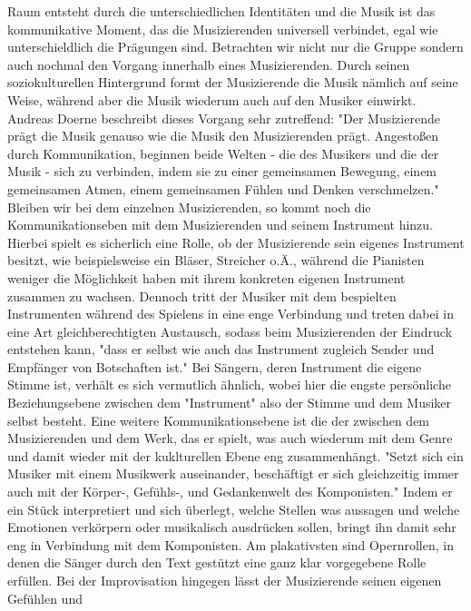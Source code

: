 Raum entsteht durch die unterschiedlichen Identitäten und die Musik ist das
kommunikative Moment, das die Musizierenden universell verbindet, egal wie
unterschieldlich die Prägungen sind. Betrachten wir nicht nur die Gruppe sondern
auch nochmal den Vorgang innerhalb eines Musizierenden. Durch seinen soziokulturellen Hintergrund
formt der Musizierende die Musik nämlich auf seine Weise, während aber die Musik
wiederum auch auf den Musiker einwirkt. Andreas Doerne beschreibt dieses Vorgang sehr
zutreffend:
"Der Musizierende prägt die Musik genauso wie die Musik den Musizierenden prägt.
Angestoßen durch Kommunikation, beginnen beide Welten - die des Musikers und die
der Musik - sich zu verbinden, indem sie zu einer gemeinsamen Bewegung, einem
gemeinsamen Atmen, einem gemeinsamen Fühlen und Denken verschmelzen." \autocite[60]{doerne:umfassend_musizieren}
Bleiben wir bei dem einzelnen Musizierenden, so kommt noch die
Kommunikationseben mit dem Musizierenden und seinem Instrument hinzu. Hierbei
spielt es sicherlich eine Rolle, ob der Musizierende sein eigenes Instrument
besitzt, wie beispielsweise ein Bläser, Streicher o.Ä., während die Pianisten
weniger die Möglichkeit haben mit ihrem konkreten eigenen Instrument zusammen zu
wachsen. Dennoch tritt der Musiker mit dem bespielten Instrumenten während des
Spielens in eine enge Verbindung und treten dabei in eine Art gleichberechtigten
Austausch, sodass beim Musizierenden der Eindruck entstehen kann, "dass er selbst wie auch das Instrument zugleich Sender und
Empfänger von Botschaften ist." \autocite[59]{doerne:umfassend_musizieren}
Bei Sängern, deren Instrument die eigene Stimme ist, verhält es sich vermutlich
ähnlich, wobei hier die engste persönliche Beziehungsebene zwischen dem
"Instrument" also der Stimme und dem Musiker selbst besteht. 
Eine weitere Kommunikationsebene ist die der zwischen dem Musizierenden und dem
Werk, das er spielt, was auch wiederum mit dem Genre und damit wieder mit der
kuklturellen Ebene eng zusammenhängt.
"Setzt sich ein Musiker mit einem Musikwerk auseinander, beschäftigt er sich
gleichzeitig immer auch mit der Körper-, Gefühls-, und Gedankenwelt des
Komponisten." \autocite[59]{doerne:umfassend_musizieren} Indem er ein Stück
interpretiert und sich überlegt, welche Stellen was aussagen und welche
Emotionen verkörpern oder musikalisch ausdrücken sollen, bringt ihn damit sehr
eng in Verbindung mit dem Komponisten. Am plakativsten sind Opernrollen, in denen die
Sänger durch den Text gestützt eine ganz klar vorgegebene Rolle erfüllen. Bei
der Improvisation hingegen lässt der Musizierende seinen eigenen Gefühlen und

